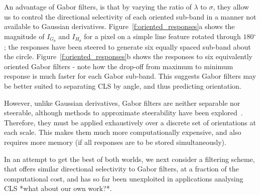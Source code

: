 \documentclass{IEEEtran}
\newcommand{\fref}[1]{Figure~\ref{#1}}
\def\deg{\ensuremath{^\circ}}
\begin{document}
An advantage of Gabor filters, is that by varying the ratio of $\lambda$ to $\sigma$, they allow us to control the directional selectivity of each oriented sub-band in a manner not available to Gaussian derivatives. \fref{f:oriented_responses}a shows the magnitude of $I_{G_\theta}$ and $I_{H_\theta}$ for a pixel on a simple line feature rotated through $180\deg$; the responses have been steered to generate six equally spaced sub-band about the circle. \fref{f:oriented_responses}b shows the responses to six equivalently oriented Gabor filters - note how the drop-off from maximum to minimum response is much faster for each Gabor sub-band. This suggests Gabor filters may be better suited to separating CLS by angle, and thus predicting orientation.

However, unlike Gaussian derivatives, Gabor filters are neither separable nor steerable, although methods to approximate steerability have been explored~\cite{Teo_1987,Perona_PAMI95}. Therefore, they must be applied exhaustively over a discrete set of orientations at each scale. This makes them much more computationally expensive, and also requires more memory (if all responses are to be stored simultaneously).

In an attempt to get the best of both worlds, we next consider a filtering scheme, that offers similar directional selectivity to Gabor filters, at a fraction of the computational cost, and has so far been unexploited in applications analysing CLS *what about our own work?*.
\end{document}
